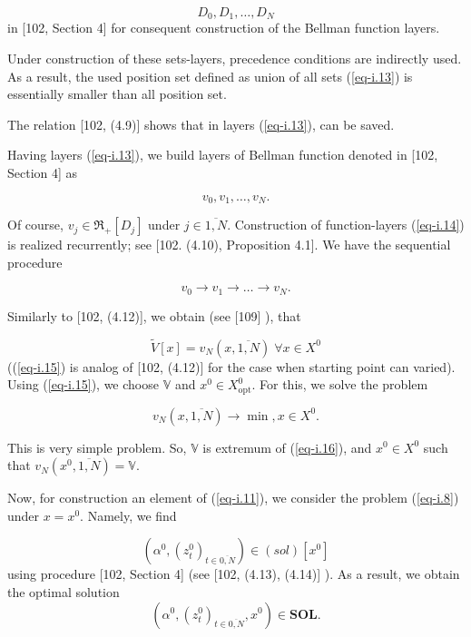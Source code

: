 \documentclass{article}
\begin{document}
\begin{equation}
  \label{eq-i.13}
  D_0, D_1, \dots , D_N
\end{equation}
in
[102, Section 4]  %
for consequent construction of the Bellman function layers.

Under construction of these sets-layers,
precedence conditions are indirectly used.
As a result,
the used position set defined as union of all sets (\ref{eq-i.13})
is essentially smaller than all position set.

The relation
[102, (4.9)]  %
shows that in layers (\ref{eq-i.13}),
can be saved.

Having layers (\ref{eq-i.13}),
we build layers of Bellman function denoted in
[102, Section 4]  %
as

\begin{equation}
  \label{eq-i.14}
  v_0, v_1, \dots , v_N.
\end{equation}

Of course,
$v_j \in \mathfrak R_+[D_j]$
under
$j \in \overline{1,N}$.
Construction of function-layers (\ref{eq-i.14})
is realized recurrently;
see
[102. (4.10), Proposition 4.1].   %
We have the sequential procedure

\begin{equation*}
  v_0 \to v_1 \to \dots \to v_N.
\end{equation*}

Similarly to
[102, (4.12)], %
we obtain
(see
[109] %
),
that

\begin{equation}
  \label{eq-i.15}
  \tilde{V}[x] = v_N(x, \overline{1,N})
  \;
  \forall x \in X^0
\end{equation}
((\ref{eq-i.15})
is analog of
[102, (4.12)]   %
for the case when starting point can varied).
Using (\ref{eq-i.15}),
we choose
$\mathbb V$
and
$x^0 \in X^0_{\mathrm{opt}}$.
For this,
we solve the problem

\begin{equation}
  \label{eq-i.16}
  v_N(x, \overline{1,N}) \to \min,
  x \in X^0.
\end{equation}

This is very simple problem.
So,
$\mathbb V$
is extremum of (\ref{eq-i.16}),
and
$x^0 \in X^0$
such that
$v_N(x^0, \overline{1,N}) = \mathbb V$.

Now, for construction an element of (\ref{eq-i.11}),
we consider the problem (\ref{eq-i.8})
under
$x=x^0$.
Namely,
we find

\begin{equation*}
  (\alpha^0, (z_t^0)_{t\in \overline{0,N}}) \in
  (sol)[x^0]
\end{equation*}
using procedure
[102, Section 4]  %
(see
[102, (4.13), (4.14)] %
).
As a result,
we obtain the optimal solution
\begin{equation*}
  (\alpha^0, (z_t^0)_{t\in \overline{0,N}}, x^0)
  \in \mathbf{SOL}.
\end{equation*}
\end{document}
